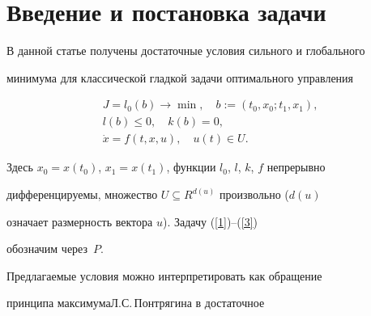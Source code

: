\pagestyle{plain} %







\maketitle


\label{begin}











\section{Введение и постановка задачи}





В данной статье получены достаточные условия сильного и глобального


минимума для классической гладкой задачи оптимального управления


\begin{gather}


J=l_0(b)\rightarrow\min,\quad b:=(t_0,x_0 ; t_1,x_1),\label{1} \\


%


l(b)\leq 0,\quad k(b)=0, \label{2} \\


%


\Dot{x}=f(t,x,u),\quad u(t)\in U. \label{3}


\end{gather}


Здесь $x_0 =x(t_0)$, $x_1 =x(t_1)$, функции $l_0$, $l$, $k$, $f$ непрерывно


дифференцируемы, множество $U\subseteq R^{d(u)}$ произвольно ($d(u)$


означает размерность вектора $u$). Задачу (\ref{1})--(\ref{3})


обозначим через~$P$.





Предлагаемые условия можно интерпретировать как обращение


принципа максимума\linebreak Л.С.\,Понтрягина \cite{1} в достаточное



